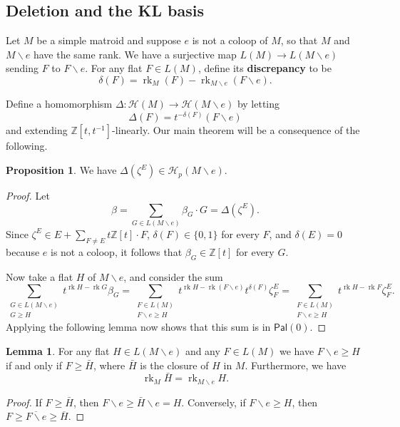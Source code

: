 \documentclass[12pt,reqno]{amsart}
\theoremstyle{definition}
\newtheorem{lemma}[theorem]{Lemma}
\newtheorem{proposition}[theorem]{Proposition}
\theoremstyle{remark}
\newcommand{\ssm}{\smallsetminus}
\newcommand{\rk}{\operatorname{rk}}
\newcommand{\Z}{{\mathbb{Z}}}
\renewcommand{\(}{\left(}
\renewcommand{\)}{\right)}
\newcommand{\<}{\left<}
\renewcommand{\>}{\right>}
\newcommand{\cal}{\mathcal}
\newcommand{\cH}{{\cal H}}
\newcommand{\Pal}{\mathsf{Pal}}
\begin{document}
\subsection{Deletion and the KL basis}

Let $M$ be a simple matroid and suppose $e$ is not a coloop of $M$, so that $M$ and $M \ssm e$ have the same rank.  
We have a surjective map $L(M) \to L(M\ssm e)$
sending $F$ to $F \ssm e$.  For any flat $F \in L(M)$, define its \textbf{discrepancy} to be 
\[\delta(F) = \rk_M(F)-\rk_{M\ssm e}(F\ssm e).\]

Define a homomorphism
$\Delta \colon \cH(M) \to \cH(M\ssm e)$ by letting
\[\Delta(F) = t^{-\delta(F)}(F\ssm e)\]
and extending $\Z[t,t^{-1}]$-linearly.  Our main theorem will be a consequence of the following.

\begin{proposition}\label{prop:semi-small}
We have $\Delta(\zeta^E) \in \cH_p(M\ssm e)$.
\end{proposition}
\begin{proof}
Let
\[\beta = \sum_{G\in L(M\ssm e)} \beta_G\cdot G = \Delta(\zeta^E).\]
Since $\zeta^E \in E + \sum_{F \ne E} t\Z[t]\cdot F$, $\delta(F)\in \{0,1\}$ for every $F$, and 
$\delta(E)=0$ because $e$ is not a coloop, it follows that $\beta_G\in \Z[t]$ for every $G$.

Now take a flat $H$ of $M\ssm e$, and consider the sum
\[\sum_{\substack{G \in L(M\ssm e) \\ G \ge H}} t^{\rk H - \rk G} \beta_G
= \sum_{\substack{F \in L(M)\\ F \ssm e \ge H}} t^{\rk H - \rk(F\ssm e)}t^{\delta(F)}\zeta^E_F = \sum_{\substack{F \in L(M)\\ F \ssm e \ge H}} t^{\rk H - \rk F}\zeta^E_F.\]
Applying the following lemma now shows that this sum is in $\Pal(0)$.
\end{proof}

\begin{lemma}
For any flat $H\in L(M\ssm e)$ and any $F \in L(M)$ we have $F \ssm e \ge H$ if and only if $F \ge \bar{H}$, where $\bar H$ is the closure of $H$ in $M$.  Furthermore, we have
\[\rk_M \bar{H} = \rk_{M\ssm e} H.\]
\end{lemma}
\begin{proof}
If $F \ge \bar{H}$, then $F \ssm e \ge \bar{H} \ssm e = H$.  Conversely, if
$F\ssm e \ge H$, then $F \ge \overline{F \ssm e} \ge \overline{H}$.
\end{proof}
\end{document}
